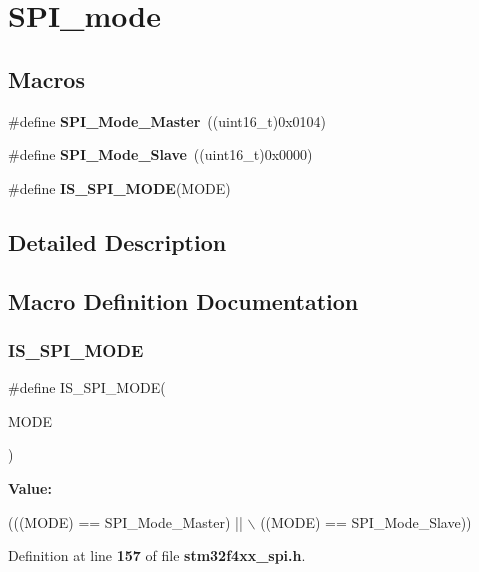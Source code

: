 \section{S\+P\+I\+\_\+mode}
\label{group__SPI__mode}
\subsection*{Macros}
\begin{DoxyCompactItemize}
\item 
\#define \textbf{ S\+P\+I\+\_\+\+Mode\+\_\+\+Master}~((uint16\+\_\+t)0x0104)
\item 
\#define \textbf{ S\+P\+I\+\_\+\+Mode\+\_\+\+Slave}~((uint16\+\_\+t)0x0000)
\item 
\#define \textbf{ I\+S\+\_\+\+S\+P\+I\+\_\+\+M\+O\+DE}(M\+O\+DE)
\end{DoxyCompactItemize}


\subsection{Detailed Description}


\subsection{Macro Definition Documentation}
\mbox{\label{group__SPI__mode_gad5135300763c75dbb446861536359f12}} 
\subsubsection{I\+S\+\_\+\+S\+P\+I\+\_\+\+M\+O\+DE}
{\footnotesize\ttfamily \#define I\+S\+\_\+\+S\+P\+I\+\_\+\+M\+O\+DE(\begin{DoxyParamCaption}\item[{}]{M\+O\+DE }\end{DoxyParamCaption})}

{\bfseries Value\+:}
\begin{DoxyCode}
(((MODE) == SPI_Mode_Master) || \(\backslash\)
                           ((MODE) == SPI_Mode_Slave))
\end{DoxyCode}


Definition at line \textbf{ 157} of file \textbf{ stm32f4xx\+\_\+spi.\+h}.

